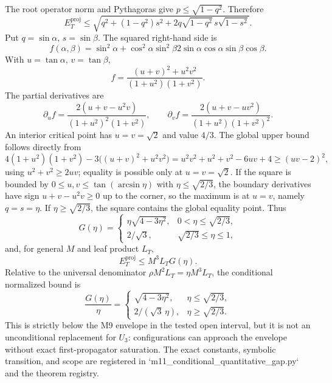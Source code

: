 The root operator norm and Pythagoras give
$p\le\sqrt{1-q^2}$.  Therefore
\[
 E_T^{\mathrm{proj}}\le
 \sqrt{q^2+(1-q^2)s^2+2q\sqrt{1-q^2}\,s\sqrt{1-s^2}}.
\]
Put $q=\sin\alpha$, $s=\sin\beta$.  The squared right-hand side is
\[
 f(\alpha,\beta)=
 \sin^2\alpha+\cos^2\alpha\sin^2\beta
 2\sin\alpha\cos\alpha\sin\beta\cos\beta.
\]
With $u=\tan\alpha$, $v=\tan\beta$,
\[
 f=\frac{(u+v)^2+u^2v^2}{(1+u^2)(1+v^2)}.
\]
The partial derivatives are
\[
 \partial_u f=\frac{2(u+v-u^2v)}{(1+u^2)^2(1+v^2)},
 \qquad
 \partial_v f=\frac{2(u+v-uv^2)}{(1+u^2)(1+v^2)^2}.
\]
An interior critical point has $u=v=\sqrt2$ and value $4/3$.  The global
upper bound follows directly from
\[
  4(1+u^2)(1+v^2)-3\big((u+v)^2+u^2v^2\big)
  =u^2v^2+u^2+v^2-6uv+4
  \ge (uv-2)^2,
\]
using $u^2+v^2\ge2uv$; equality is possible only at
$u=v=\sqrt2$.  If the square is bounded by
$0\le u,v\le\tan(\arcsin\eta)$ with $\eta\le\sqrt{2/3}$, the boundary
derivatives have sign $u+v-u^2v\ge0$ up to the corner, so the maximum is at
$u=v$, namely $q=s=\eta$.  If $\eta\ge\sqrt{2/3}$, the square contains the
global equality point.  Thus
\[
 \boxed{
 G(\eta)=
 \begin{cases}
  \eta\sqrt{4-3\eta^2}, & 0<\eta\le\sqrt{2/3},\\[2mm]
  2/\sqrt3, & \sqrt{2/3}\le\eta\le1,
 \end{cases}}
 \]
and, for general $M$ and leaf product $L_T$,\[
 E_T^{\mathrm{proj}}\le M^3L_TG(\eta).
\]
Relative to the universal denominator $\rho M^2L_T=\eta M^3L_T$, the
conditional normalized bound is
\[
 \frac{G(\eta)}\eta=
 \begin{cases}
  \sqrt{4-3\eta^2}, & \eta\le\sqrt{2/3},\\[2mm]
  2/(\sqrt3\,\eta), & \eta\ge\sqrt{2/3}.
 \end{cases}
\]
This is strictly below the M9 envelope in the tested open interval, but it is
not an unconditional replacement for $U_3$: configurations can approach the
envelope without exact first-propagator saturation. The exact constants,
symbolic transition, and scope are registered in
`m11_conditional_quantitative_gap.py` and the theorem registry.
